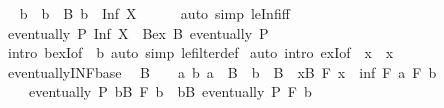 \begin{isabellebody}
\ \isamarkupfalse%
\ b\ \ {\isachardoublequoteopen}b\ {\isasymin}\ B{\isachardoublequoteclose}\ {\isachardoublequoteopen}b\ {\isasymle}\ Inf\ X{\isachardoublequoteclose}\isanewline
\ \ \ \ \isamarkupfalse%
\ {\isacharparenleft}{\kern0pt}auto\ simp{\isacharcolon}{\kern0pt}\ le{\isacharunderscore}{\kern0pt}Inf{\isacharunderscore}{\kern0pt}iff{\isacharparenright}{\kern0pt}\isanewline
\ \ \isamarkupfalse%
\ \isamarkupfalse%
\ {\isachardoublequoteopen}eventually\ P\ {\isacharparenleft}{\kern0pt}Inf\ X{\isacharparenright}{\kern0pt}\ {\isasymLongrightarrow}\ Bex\ B\ {\isacharparenleft}{\kern0pt}eventually\ P{\isacharparenright}{\kern0pt}{\isachardoublequoteclose}\isanewline
\ \ \ \ \isamarkupfalse%
\ {\isacharparenleft}{\kern0pt}intro\ bexI{\isacharbrackleft}{\kern0pt}of\ {\isacharunderscore}{\kern0pt}\ b{\isacharbrackright}{\kern0pt}{\isacharparenright}{\kern0pt}\ {\isacharparenleft}{\kern0pt}auto\ simp{\isacharcolon}{\kern0pt}\ le{\isacharunderscore}{\kern0pt}filter{\isacharunderscore}{\kern0pt}def{\isacharparenright}{\kern0pt}\isanewline
{}\isamarkupfalse%
\ {\isacharparenleft}{\kern0pt}auto\ intro{\isacharbang}{\kern0pt}{\isacharcolon}{\kern0pt}\ exI{\isacharbrackleft}{\kern0pt}of\ {\isacharunderscore}{\kern0pt}\ {\isachardoublequoteopen}{\isacharbraceleft}{\kern0pt}x{\isacharbraceright}{\kern0pt}{\isachardoublequoteclose}\ \ x{\isacharbrackright}{\kern0pt}{\isacharparenright}{\kern0pt}%
\endisatagproof
{\isafoldproof}%
%
\isadelimproof
\isanewline
%
\endisadelimproof
\isanewline
{}\isamarkupfalse%
\ eventually{\isacharunderscore}{\kern0pt}INF{\isacharunderscore}{\kern0pt}base{\isacharcolon}{\kern0pt}\isanewline
\ \ {\isachardoublequoteopen}B\ {\isasymnoteq}\ {\isacharbraceleft}{\kern0pt}{\isacharbraceright}{\kern0pt}\ {\isasymLongrightarrow}\ {\isacharparenleft}{\kern0pt}{\isasymAnd}a\ b{\isachardot}{\kern0pt}\ a\ {\isasymin}\ B\ {\isasymLongrightarrow}\ b\ {\isasymin}\ B\ {\isasymLongrightarrow}\ {\isasymexists}x{\isasymin}B{\isachardot}{\kern0pt}\ F\ x\ {\isasymle}\ inf\ {\isacharparenleft}{\kern0pt}F\ a{\isacharparenright}{\kern0pt}\ {\isacharparenleft}{\kern0pt}F\ b{\isacharparenright}{\kern0pt}{\isacharparenright}{\kern0pt}\ {\isasymLongrightarrow}\isanewline
\ \ \ \ eventually\ P\ {\isacharparenleft}{\kern0pt}{\isasymSqinter}b{\isasymin}B{\isachardot}{\kern0pt}\ F\ b{\isacharparenright}{\kern0pt}\ {\isasymlongleftrightarrow}\ {\isacharparenleft}{\kern0pt}{\isasymexists}b{\isasymin}B{\isachardot}{\kern0pt}\ eventually\ P\ {\isacharparenleft}{\kern0pt}F\ b{\isacharparenright}{\kern0pt}{\isacharparenright}{\kern0pt}{\isachardoublequoteclose}\isanewline

\end{isabellebody}
